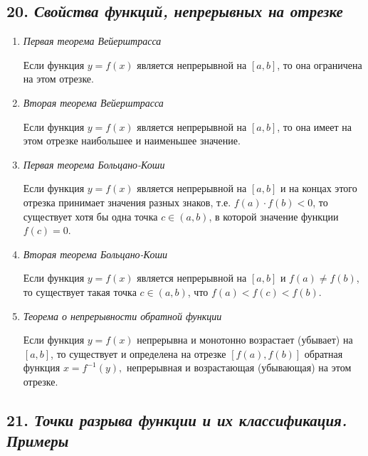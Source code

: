 \subsection*{20. \textit{Свойства функций, непрерывных на отрезке}}
\begin{enumerate}

\item \textit{Первая теорема Вейерштрасса}

Если функция $y = f(x)$ является непрерывной на $[a, b]$, то она ограничена на этом отрезке.
\item \textit{Вторая теорема Вейерштрасса}

Если функция $y = f(x)$ является непрерывной на $[a, b]$, то она имеет на этом отрезке наибольшее и наименьшее значение. %
\item \textit{Первая теорема Больцано-Коши}

Если функция $y = f(x)$ является непрерывной на $[a, b]$ и на концах этого отрезка принимает значения разных знаков, т.е. $f(a)\cdot f(b) < 0$, то существует хотя бы одна точка $c \in (a, b)$, в которой значение функции $f(c) = 0$.
\item \textit{Вторая теорема Больцано-Коши}

Если функция $y = f(x)$ является непрерывной на $[a, b]$ и $f(a)\neq f(b)$, то существует такая точка $c \in (a, b)$, что $f(a) < f(c) < f(b)$.
\item \textit{Теорема о непрерывности обратной функции}

Если функция $y = f(x)$ непрерывна и монотонно возрастает (убывает) на $[a, b]$, то существует и определена на отрезке $[f(a), f(b)]$ обратная функция $x = f^{-1}(y),$ непрерывная и возрастающая (убывающая) на этом отрезке.

\end{enumerate}
\newpage 
\subsection*{21. \textit{Точки разрыва функции и их классификация. Примеры}}

